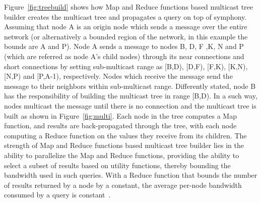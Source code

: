 %
Figure~\ref{fig:treebuild} shows how Map and Reduce functions based
multicast tree builder creates the multicast tree and propagates a query
on top of symphony.
%
Assuming that node A is an origin node which sends a message over the
entire network (or alternatively a bounded region of the network, in
this example the bounds are A and P).
%
Node A sends a message to nodes B, D, F ,K, N and P (which are referred
as node A's child nodes) through its near connections and short
connections by setting sub-multicast range as [B,D), [D,F), [F,K),
[K,N), [N,P) and [P,A-1), respectively.
%
Nodes which receive the message send the message to their neighbors
within sub-multicast range.
%
Differently stated, node B has the responsibility of building the
multicast tree in range [B,D).
%
In a such way, nodes multicast the message until there is no connection
and the multicast tree is built as shown in Figure~\ref{fig:multi}.
%
Each node in the tree computes a Map function, and results are
back-propagated through the tree, with each node computing a Reduce
function on the values they receive from its children.
%
The strength of Map and Reduce functions based multicast tree builder
lies in the ability to parallelize the Map and Reduce functions,
providing the ability to select a subset of results based on utility
functions, thereby bounding the bandwidth used in such queries.
%
With a Reduce function that bounds the number of results returned by a
node by a constant, the average per-node bandwidth consumed by a query
is constant~\cite{deetoo, lee}.
%

